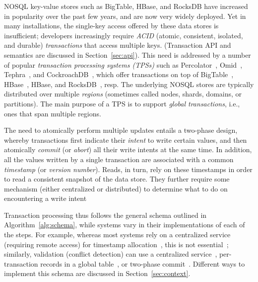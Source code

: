 
NOSQL key-value stores such as BigTable, HBase, and RocksDB have increased in popularity over the past few years, and are now very widely deployed. Yet in many installations, the single-key access offered by these data stores is insufficient; developers  increasingly require 
 \emph{ACID} (atomic, consistent, isolated, and durable) \emph{transactions} that access multiple keys.
 (Transaction API and semantics are discussed in Section~\ref{sec:api}).
This need is addressed by a number of popular  \emph{transaction processing systems (TPSs)} 
such as  Percolator~\cite{Percolator2010}, Omid~\cite{OmidICDE2014,omid-blog}, Tephra~\cite{tephra}, and CockroachDB~\cite{cockroach}, 
which offer transactions on top of  BigTable~\cite{bigtable-osdi06}, HBase~\cite{hbase}, HBase, and RocksDB~\cite{rocksdb}, resp. 
The underlying NOSQL stores are typically distributed  over multiple \emph{regions} (sometimes called nodes, shards, domains, or partitions).
The main purpose of a TPS is to support \emph{global transactions}, i.e., ones that span multiple regions.

The need to atomically perform multiple  updates  entails a two-phase design, whereby transactions first indicate their \emph{intent} to write certain values, and then atomically \emph{commit} (or \emph{abort}) all their write intents at the same time. In addition, 
all the values written by a single transaction are associated with a common  \emph{timestamp} (or \emph{version number}). 
Reads, in turn, rely on these timestamps in order to read a consistent snapshot of the data store. They further  
require some mechanism (either centralized or distributed) to determine what to do on encountering a write intent

Transaction processing thus follows the general schema outlined in Algorithm~\ref{alg:schema}, 
while systems vary in their implementations of each of the steps. 
For example, whereas most systems rely on a centralized service (requiring remote access) for timestamp allocation~\cite{OmidICDE2014,omid-blog,tephra,Percolator2010}, this is not essential~\cite{cockroach}; similarly, validation (conflict detection) can use a centralized service~\cite{OmidICDE2014,omid-blog,tephra}, per-transaction records in a global table~\cite{cockroach}, or two-phase commit~\cite{Percolator2010}. Different ways to implement this schema are  discussed in Section~\ref{sec:context}.
 

